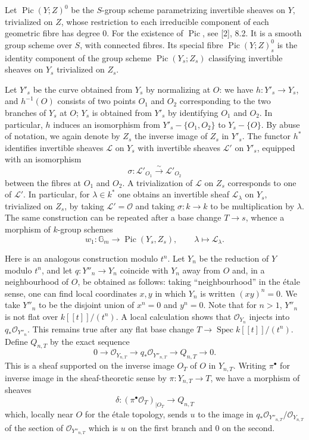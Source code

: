 \documentclass[11pt]{article}
\DeclareMathOperator{\Spec}{Spec}
\DeclareMathOperator{\Pic}{Pic}
\newcommand{\OO}{\mathcal O}
\newcommand{\GG}{\mathbb G}
\begin{document}
Let $\Pic(Y;Z)^0$ be the $S$-group scheme parametrizing invertible sheaves on $Y$, trivialized on $Z$, whose restriction to each irreducible component of each geometric fibre has degree 0. For the existence of $\Pic$, see [2], 8.2. It is a smooth group scheme over $S$, with connected fibres. Its special fibre $\Pic(Y;Z)^0_s$ is the identity component of the group scheme $\Pic(Y_s;Z_s)$ classifying invertible sheaves on $Y_s$ trivialized on $Z_s$.

Let $Y'_s$ be the curve obtained from $Y_s$ by normalizing at $O$: we have $h:Y'_s\to Y_s$, and $h^{-1}(O)$ consists of two points $O_1$ and $O_2$ corresponding to the two branches of $Y_s$ at $O$; $Y_s$ is obtained from $Y'_s$ by identifying $O_1$ and $O_2$. In particular, $h$ induces an isomorphism from $Y'_s-\{O_1,O_2\}$ to $Y_s-\{O\}$. By abuse of notation, we again denote by $Z_s$ the inverse image of $Z_s$ in $Y'_s$. The functor $h^*$ identifies invertible sheaves $\mathscr L$ on $Y_s$ with invertible sheaves $\mathscr L'$ on $Y'_s$, equipped with an isomorphism
\[
        \sigma:\mathscr L'_{O_1}\xrightarrow{\sim}\mathscr L'_{O_2}
\]
between the fibres at $O_1$ and $O_2$. A trivialization of $\mathscr L$ on $Z_s$ corresponds to one of $\mathscr L'$. In particular, for $\lambda\in k^*$ one obtains an invertible sheaf $\mathscr L_\lambda$ on $Y_s$, trivialized on $Z_s$, by taking $\mathscr L'=\OO$ and taking $\sigma:k\to k$ to be multiplication by $\lambda$. The same construction can be repeated after a base change $T\to s$, whence a morphism of $k$-group schemes
\begin{equation}
        w_1:\GG_m\longrightarrow\Pic(Y_s,Z_s),\qquad
        \lambda\longmapsto\mathscr L_\lambda. \tag{2.4.1}
\end{equation}

Here is an analogous construction modulo $t^n$. Let $Y_n$ be the reduction of $Y$ modulo $t^n$, and let $q:Y''_n\to Y_n$ coincide with $Y_n$ away from $O$ and, in a neighbourhood of $O$, be obtained as follows: taking ``neighbourhood'' in the étale sense, one can find local coordinates $x,y$ in which $Y_n$ is written $(xy)^n=0$. We take $Y''_n$ to be the disjoint union of $x^n=0$ and $y^n=0$. Note that for $n>1$, $Y''_n$ is not flat over $k[[t]]/(t^n)$. A local calculation shows that $\OO_{Y_n}$ injects into $q_*\OO_{Y''_n}$. This remains true after any flat base change $T\to\Spec k[[t]]/(t^n)$. Define $Q_{n,T}$ by the exact sequence
\begin{equation}
        0\longrightarrow\OO_{Y_{n,T}}\longrightarrow q_*\OO_{Y''_{n,T}}\longrightarrow Q_{n,T}\longrightarrow0. \tag{2.4.2}
\end{equation}
This is a sheaf supported on the inverse image $O_T$ of $O$ in $Y_{n,T}$. Writing $\pi^\bullet$ for inverse image in the sheaf-theoretic sense by $\pi:Y_{n,T}\to T$, we have a morphism of sheaves
\begin{equation}
        \delta:(\pi^\bullet\OO_T)_{|O_T}\longrightarrow Q_{n,T} \tag{2.4.3}
\end{equation}
which, locally near $O$ for the étale topology, sends $u$ to the image in $q_*\OO_{Y''_{n,T}}/\OO_{Y_{n,T}}$ of the section of $\OO_{Y''_{n,T}}$ which is $u$ on the first branch and 0 on the second.
\end{document}
